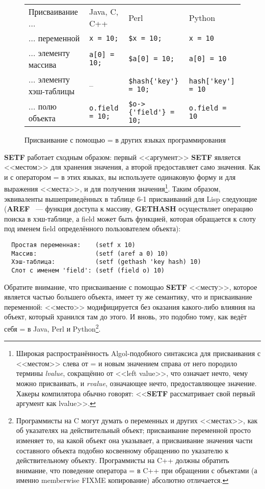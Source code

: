 \begin{figure}[tb]
\begin{tabular}{|>{\centering}m{25mm}|>{\centering}m{25mm}|>{\centering}m{25mm}|>{\centering}m{25mm}|}
Присваивание ...         & Java, C, C++        & Perl                & Python \\
... переменной           & \lstinline!x = 10;! & \lstinline!$x = 10;! & \lstinline!x = 10! \\
... элементу массива     & \lstinline!a[0] = 10;! & \lstinline!$a[0] = 10;! & \lstinline!a[0] = 10! \\
... элементу хэш-таблицы & --                  & \lstinline!$hash{'key'} = 10;!  & \lstinline!hash['key'] = 10! \\
... полю объекта         & \lstinline!o.field = 10;! & \lstinline!$o->{'field'} = 10;! & \lstinline!o.field = 10! 
\end{tabular}
  \caption{Присваивание с помощью = в других языках программирования} 
  \label{table:06-1}
\end{figure}


\textbf{SETF} работает сходным образом: первый <<аргумент>> \textbf{SETF}
является <<местом>> для хранения значения, а второй предоставляет само значения. Как и с оператором = в этих
языках, вы используете одинаковую форму и для выражения <<места>>, и для получения
значения\footnote{Широкая распространённость Algol-подобного синтаксиса для присваивания с
  <<местом>> слева от = и новым значением справа от него породило термины \textit{lvalue},
  сокращённо от <<left value>>, что означает нечто, чему можно присваивать, и
  \textit{rvalue}, означающее нечто, предоставляющее значение. Хакеры компилятора обычно
  говорят: <<\textbf{SETF} рассматривает свой первый аргумент как lvalue>>.}. Таким образом,
эквиваленты вышеприведённых в таблице 6-1 присваиваний для Lisp следующие (\textbf{AREF}
~--- функция доступа к массиву, \textbf{GETHASH} осуществляет операцию поиска в
хэш-таблице, а field может быть функцией, которая обращается к слоту под именем field
определённого пользователем объекта):

\begin{verbatim}
  Простая переменная:    (setf x 10) 
  Массив:                (setf (aref a 0) 10)
  Хэш-таблица:           (setf (gethash 'key hash) 10)
  Слот с именем 'field': (setf (field o) 10)
\end{verbatim}

Обратите внимание, что присваиваение с помощью \textbf{SETF} <<месту>>, которое является
частью большего объекта, имеет ту же семантику, что и присваивание переменной: <<место>>
модифицируется без оказания какого-либо влияния на объект, который хранился там до
этого. И вновь, это подобно тому, как ведёт себя = в Java, Perl и
Python\footnote{Программисты на C могут думать о переменных и других <<местах>>, как об
  указателях на действительный объект; присваивание переменной просто изменяет
  то, на какой объект она указывает, а присваивание значения части составного объекта
  подобно косвенному обращению по указателю к действительному объекту. Программисты на C++
  должны обратить внимание, что поведение оператора = в C++ при обращении с объектами (а
  именно memberwise FIXME копирование) абсолютно отличается.}.

